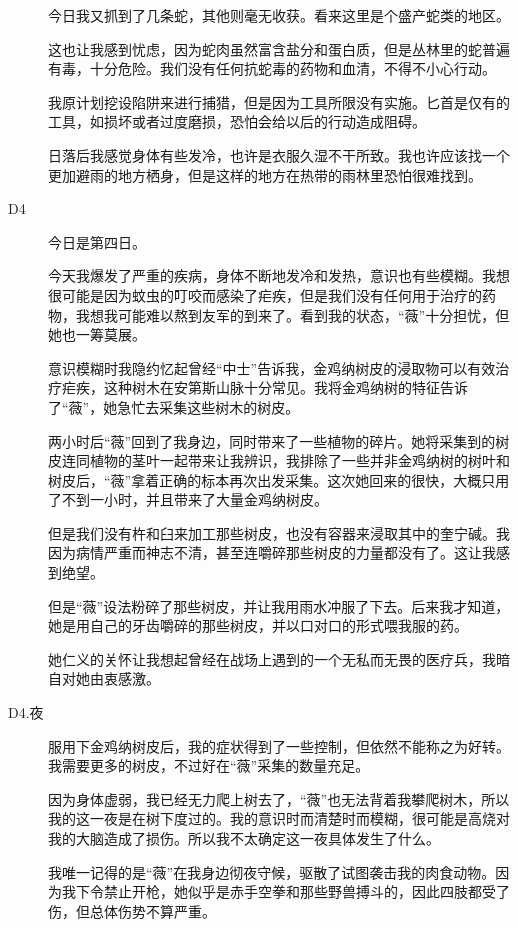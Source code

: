\begin{description}
今日我又抓到了几条蛇，其他则毫无收获。看来这里是个盛产蛇类的地区。

这也让我感到忧虑，因为蛇肉虽然富含盐分和蛋白质，但是丛林里的蛇普遍有毒，十分危险。我们没有任何抗蛇毒的药物和血清，不得不小心行动。

我原计划挖设陷阱来进行捕猎，但是因为工具所限没有实施。匕首是仅有的工具，如损坏或者过度磨损，恐怕会给以后的行动造成阻碍。

日落后我感觉身体有些发冷，也许是衣服久湿不干所致。我也许应该找一个更加避雨的地方栖身，但是这样的地方在热带的雨林里恐怕很难找到。

\item[D4]

今日是第四日。

今天我爆发了严重的疾病，身体不断地发冷和发热，意识也有些模糊。我想很可能是因为蚊虫的叮咬而感染了疟疾，但是我们没有任何用于治疗的药物，我想我可能难以熬到友军的到来了。看到我的状态，“薇”十分担忧，但她也一筹莫展。

意识模糊时我隐约忆起曾经“中士”告诉我，金鸡纳树皮的浸取物可以有效治疗疟疾，这种树木在安第斯山脉十分常见。我将金鸡纳树的特征告诉了“薇”，她急忙去采集这些树木的树皮。

两小时后“薇”回到了我身边，同时带来了一些植物的碎片。她将采集到的树皮连同植物的茎叶一起带来让我辨识，我排除了一些并非金鸡纳树的树叶和树皮后，“薇”拿着正确的标本再次出发采集。这次她回来的很快，大概只用了不到一小时，并且带来了大量金鸡纳树皮。

但是我们没有杵和臼来加工那些树皮，也没有容器来浸取其中的奎宁碱。我因为病情严重而神志不清，甚至连嚼碎那些树皮的力量都没有了。这让我感到绝望。

但是“薇”设法粉碎了那些树皮，并让我用雨水冲服了下去。后来我才知道，她是用自己的牙齿嚼碎的那些树皮，并以口对口的形式喂我服的药。

她仁义的关怀让我想起曾经在战场上遇到的一个无私而无畏的医疗兵，我暗自对她由衷感激。

\item[D4.夜]

服用下金鸡纳树皮后，我的症状得到了一些控制，但依然不能称之为好转。我需要更多的树皮，不过好在“薇”采集的数量充足。

因为身体虚弱，我已经无力爬上树去了，“薇”也无法背着我攀爬树木，所以我的这一夜是在树下度过的。我的意识时而清楚时而模糊，很可能是高烧对我的大脑造成了损伤。所以我不太确定这一夜具体发生了什么。

我唯一记得的是“薇”在我身边彻夜守候，驱散了试图袭击我的肉食动物。因为我下令禁止开枪，她似乎是赤手空拳和那些野兽搏斗的，因此四肢都受了伤，但总体伤势不算严重。


\end{description}
